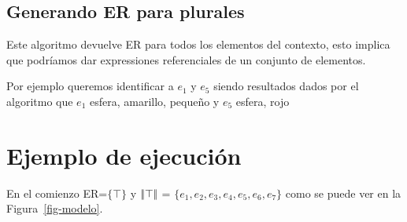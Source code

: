 \subsection{Generando ER para plurales}

Este algoritmo devuelve ER para todos los elementos del contexto, 
esto implica que podr\'iamos dar expressiones referenciales de un conjunto de elementos.

Por ejemplo queremos identificar a $e_1$ y $e_5$ 
siendo resultados dados por el algoritmo que $e_1$
esfera, amarillo, peque\~no
y $e_5$ esfera, rojo


\section{Ejemplo de ejecuci\'on}


En el comienzo ER=$\{\top\}$ y $|\!|\top|\!|$ = $\{e_1, e_2, e_3, e_4, e_5, e_6, e_7\}$ como se puede ver en la Figura~\ref{fig-modelo}.\\


%
%
%



